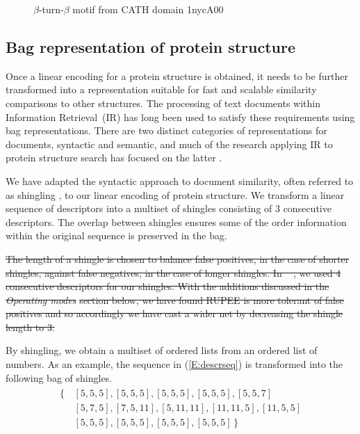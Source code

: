\documentclass[10pt,letterpaper]{article}
\providecommand{\DIFdeltex}[1]{{\protect\color{red}\sout{#1}}}                      %
\providecommand{\DIFdelbegin}{} %
\providecommand{\DIFdelend}{} %
\providecommand{\DIFdel}[1]{\texorpdfstring{\DIFdeltex{#1}}{}} %
\newcommand{\DIFscaledelfig}{0.5}
\newlength{\DIFdelgraphicswidth} %
\newlength{\DIFdelgraphicsheight} %
\newcommand{\DIFdelincludegraphics}[2][]{%
\sbox{\DIFdelgraphicsbox}{\DIFOincludegraphics[#1]{#2}}%
\settoboxwidth{\DIFdelgraphicswidth}{\DIFdelgraphicsbox} %
\settoboxtotalheight{\DIFdelgraphicsheight}{\DIFdelgraphicsbox} %
\scalebox{\DIFscaledelfig}{%
\parbox[b]{\DIFdelgraphicswidth}{\usebox{\DIFdelgraphicsbox}\\[-\baselineskip] \rule{\DIFdelgraphicswidth}{0em}}\llap{\resizebox{\DIFdelgraphicswidth}{\DIFdelgraphicsheight}{%
\setlength{\unitlength}{\DIFdelgraphicswidth}%
\begin{picture}(1,1)%
\thicklines\linethickness{2pt} %
{\color[rgb]{1,0,0}\put(0,0){\framebox(1,1){}}}%
{\color[rgb]{1,0,0}\put(0,0){\line( 1,1){1}}}%
{\color[rgb]{1,0,0}\put(0,1){\line(1,-1){1}}}%
\end{picture}%
}\hspace*{3pt}}} %
} %
\DeclareRobustCommand{\DIFdelbegin}{\DIFOdelbegin \let\includegraphics\DIFdelincludegraphics} %
\DeclareRobustCommand{\DIFdelend}{\DIFOaddend \let\includegraphics\DIFOincludegraphics} %
\begin{document}
\begin{figure}[!h]
\caption{$\beta$-turn-$\beta$ motif from CATH domain 1nycA00}
\label{fig:beta_turn}
\end{figure}

\subsection*{Bag representation of protein structure}

Once a linear encoding for a protein structure is obtained, it needs to be further transformed into a representation suitable for fast and scalable similarity comparisons to other structures.
The processing of text documents within Information Retrieval~(IR) has long been used to satisfy these requirements using bag representations.
There are two distinct categories of representations for documents, syntactic and semantic, and much of the research applying IR to protein structure search has focused on the latter \cite{Aungand2004,Zhang2010,Budowski2010}. 

We have adapted the syntactic approach to document similarity, often referred to as shingling \cite{Broder1997a}, to our linear encoding of protein structure. 
We transform a linear sequence of descriptors into a multiset of shingles consisting of 3 consecutive descriptors.
The overlap between shingles ensures some of the order information within the original sequence is preserved in the bag. 

\DIFdelbegin \DIFdel{The length of a shingle is chosen to balance false positives, in the case of shorter shingles, against false negatives, in the case of longer shingles. 
In \mbox{%
\cite{Ayoub2017}}\hspace{0pt}%
, we used 4 consecutive descriptors for our shingles. 
With the additions discussed in the }\emph{\DIFdel{Operating modes}} %
\DIFdel{section below, we have found RUPEE is more tolerant of false positives and so accordingly we have cast a wider net by decreasing the shingle length to 3. 
}%

\DIFdelend By shingling, we obtain a multiset of ordered lists from an ordered list of numbers. 
As an example, the sequence in (\ref{E:descrseq}) is transformed into the following bag of shingles. 
\begin{align}\label{E:shinglebag}
    \begin{split}
        \{\,&[5, 5, 5], [5, 5, 5], [5, 5, 5], [5, 5, 5], [5, 5, 7] \\
            & [5, 7, 5], [7, 5, 11], [5, 11, 11], [11, 11, 5], [11, 5, 5] \\
            & [5, 5, 5], [5, 5, 5], [5, 5, 5], [5, 5, 5] \,\}
    \end{split}
\end{align}
\end{document}

